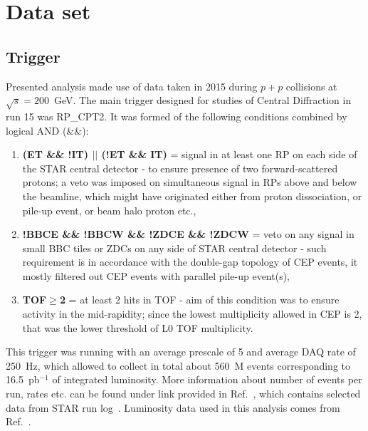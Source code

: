 

\chapter{Data set}\label{chap:dataset}

\section{Trigger}\label{seq:trigger}

Presented analysis made use of data taken in 2015 during $p+p$ collisions at $\sqrt{s}=200$~GeV. The main trigger designed for studies of Central Diffraction in run 15 was RP\_CPT2. It was formed of the following conditions combined by logical AND (\&\&):
\begin{enumerate}
 \item \textbf{(ET \&\& !IT) $||$ (!ET \&\& IT)} = signal in at least one RP on each side of the STAR central detector - to ensure presence of two forward-scattered protons; a veto was imposed on simultaneous signal in RPs above and below the beamline, which might have originated either from proton dissociation, or pile-up event, or beam halo proton etc.,\\[-15pt]
 \item \textbf{!BBCE \&\& !BBCW \&\& !ZDCE \&\& !ZDCW} = veto on any signal in small BBC tiles or ZDCs on any side of STAR central detector - such requirement is in accordance with the double-gap topology of CEP events, it mostly filtered out CEP events with parallel pile-up event(s),\\[-15pt]
 \item \textbf{TOF$\geq$2} = at least 2 hits in TOF - aim of this condition was to ensure activity in the mid-rapidity; since the lowest multiplicity allowed in CEP is 2, that was the lower threshold of L0 TOF multiplicity.
\end{enumerate}%
This trigger was running with an average prescale of 5 and average DAQ rate of 250~Hz, which allowed to collect in total about 560~M events corresponding to 16.5~pb$^{-1}$ of integrated luminosity.  More information about number of events per run, rates etc. can be found under link provided in Ref.~\cite{onlineRpTriggersMonitoring}, which contains selected data from STAR run log~\cite{RunLog}. Luminosity data used in this analysis comes from Ref.~\cite{Luminosity}.

